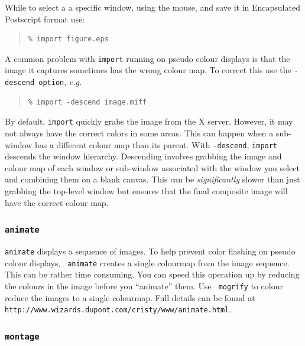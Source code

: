 \documentclass[twoside,11pt]{article}
\newcommand{\htmladdnormallink}[2]{#1}
\newcommand{\htmlref}[2]{#1}
\begin{document}
While to select a a specific window, using the mouse, and save it in
Encapsulated Postscript format use:

\small
\begin{quote}
\begin{verbatim}
% import figure.eps
\end{verbatim}
\end{quote}
\normalsize

A common problem with {\tt import} running on \htmlref{pseudo colour
}{sc15_pseudo} displays is that the image it captures sometimes has
the wrong colour map. To correct this use the {\tt -descend option},
{\em e.g.\ }

\small
\begin{quote}
\begin{verbatim}
% import -descend image.miff
\end{verbatim}
\end{quote}
\normalsize

By default, {\tt import} quickly grabs the image from the X server.
However, it may not always have the correct colors in some areas. This
can happen when a sub-window has a different colour map than its
parent. With {\tt -descend}, {\tt import} descends the window
hierarchy. Descending involves grabbing the image and colour map of
each window or sub-window associated with the window you select and
combining them on a blank canvas. This can be {\em significantly}
slower than just grabbing the top-level window but ensures that the
final composite image will have the correct colour map.

\subsubsection{{\tt animate}}

{\tt animate} displays a sequence of images. To help prevent color
flashing on \htmlref{pseudo colour}{sc15_pseudo} displays, {\tt
animate} creates a single colourmap from the image sequence. This can
be rather time consuming. You can speed this operation up by reducing
the colours in the image before you ``animate'' them. Use {\tt
mogrify} to colour reduce the images to a single colourmap. Full
details can be found at \htmladdnormallink{{\tt
http://www.wizards.dupont.com/cristy/www/animate.html}}{http://www.wizards.dupont.com/cristy/www/animate.html}.

\subsubsection{{\tt montage}}
\end{document}
